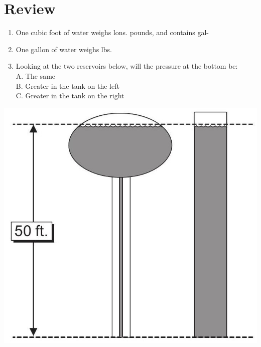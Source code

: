 \documentclass[10pt]{article}
\begin{document}
\section{Review}
\begin{enumerate}
  \item One cubic foot of water weighs lons. pounds, and contains gal-

  \item One gallon of water weighs lbs.

  \item Looking at the two reservoirs below, will the pressure at the bottom be:\\
A. The same\\
B. Greater in the tank on the left\\
C. Greater in the tank on the right

\end{enumerate}
\includegraphics[max width=\textwidth]{2022_11_03_65aa625ded296bdfd01fg-22}
\end{document}
